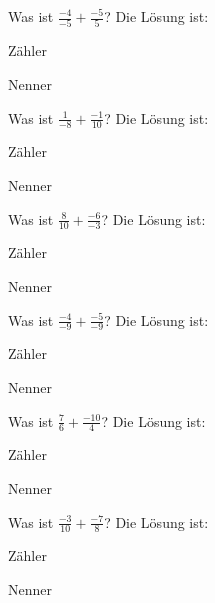\documentclass{ximera}
\begin{document}
\begin{shuffle}
\begin{question}
Was ist $\frac{-4}{-5} + \frac{-5}{5}$?
Die Lösung ist:
\begin{solution}
Zähler 
\end{solution}
\begin{solution}
Nenner 
\end{solution}
\end{question}


\begin{question}
Was ist $\frac{1}{-8} + \frac{-1}{10}$?
Die Lösung ist:
\begin{solution}
Zähler 
\end{solution}
\begin{solution}
Nenner 
\end{solution}
\end{question}


\begin{question}
Was ist $\frac{8}{10} + \frac{-6}{-3}$?
Die Lösung ist:
\begin{solution}
Zähler 
\end{solution}
\begin{solution}
Nenner 
\end{solution}
\end{question}


\begin{question}
Was ist $\frac{-4}{-9} + \frac{-5}{-9}$?
Die Lösung ist:
\begin{solution}
Zähler 
\end{solution}
\begin{solution}
Nenner 
\end{solution}
\end{question}


\begin{question}
Was ist $\frac{7}{6} + \frac{-10}{4}$?
Die Lösung ist:
\begin{solution}
Zähler 
\end{solution}
\begin{solution}
Nenner 
\end{solution}
\end{question}


\begin{question}
Was ist $\frac{-3}{10} + \frac{-7}{8}$?
Die Lösung ist:
\begin{solution}
Zähler 
\end{solution}
\begin{solution}
Nenner 
\end{solution}
\end{question}



\end{shuffle}
\end{document}

